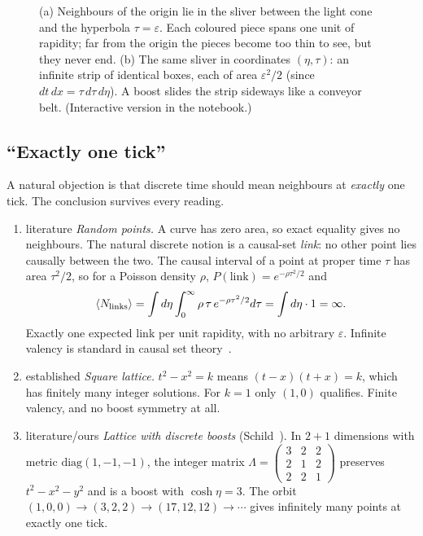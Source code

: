 \documentclass[11pt,a4paper]{article}
\newcommand{\tagbox}[2]{\textsf{\scriptsize\colorbox{#1!12}{\textcolor{#1!70!black}{#2}}}}
\newcommand{\est}{\tagbox{gray}{established}}
\newcommand{\lit}{\tagbox{blue}{literature}}
\newcommand{\ours}{\tagbox{orange}{ours}}
\begin{document}
\begin{figure}[t]
\caption{(a) Neighbours of the origin lie in the sliver between the light cone and the hyperbola $\tau=\varepsilon$. Each coloured piece spans one unit of rapidity; far from the origin the pieces become too thin to see, but they never end. (b) The same sliver in coordinates $(\eta,\tau)$: an infinite strip of identical boxes, each of area $\varepsilon^2/2$ (since $dt\,dx=\tau\,d\tau\,d\eta$). A boost slides the strip sideways like a conveyor belt. (Interactive version in the notebook.)}
\label{fig:sliver}
\end{figure}

\subsection{``Exactly one tick''}
A natural objection is that discrete time should mean neighbours at \emph{exactly} one tick. The conclusion survives every reading.
\begin{enumerate}[leftmargin=*]
\item \lit{} \emph{Random points.} A curve has zero area, so exact equality gives no neighbours. The natural discrete notion is a causal-set \emph{link}: no other point lies causally between the two. The causal interval of a point at proper time $\tau$ has area $\tau^2/2$, so for a Poisson density $\rho$, $P(\text{link})=e^{-\rho\tau^2/2}$ and
\begin{equation}
\langle N_{\rm links}\rangle=\int d\eta\int_0^\infty\rho\,\tau\,e^{-\rho\tau^2/2}d\tau=\int d\eta\cdot 1=\infty .
\end{equation}
Exactly one expected link per unit rapidity, with no arbitrary $\varepsilon$. Infinite valency is standard in causal set theory~\cite{Surya19,Sorkin11}.
\item \est{} \emph{Square lattice.} $t^2-x^2=k$ means $(t-x)(t+x)=k$, which has finitely many integer solutions. For $k=1$ only $(1,0)$ qualifies. Finite valency, and no boost symmetry at all.
\item \lit/\ours{} \emph{Lattice with discrete boosts} (Schild~\cite{Schild48}). In $2+1$ dimensions with metric $\mathrm{diag}(1,-1,-1)$, the integer matrix
$\Lambda=\left(\begin{smallmatrix}3&2&2\\2&1&2\\2&2&1\end{smallmatrix}\right)$ preserves $t^2-x^2-y^2$ and is a boost with $\cosh\eta=3$. The orbit $(1,0,0)\to(3,2,2)\to(17,12,12)\to\cdots$ gives infinitely many points at exactly one tick.
\end{enumerate}
\end{document}
